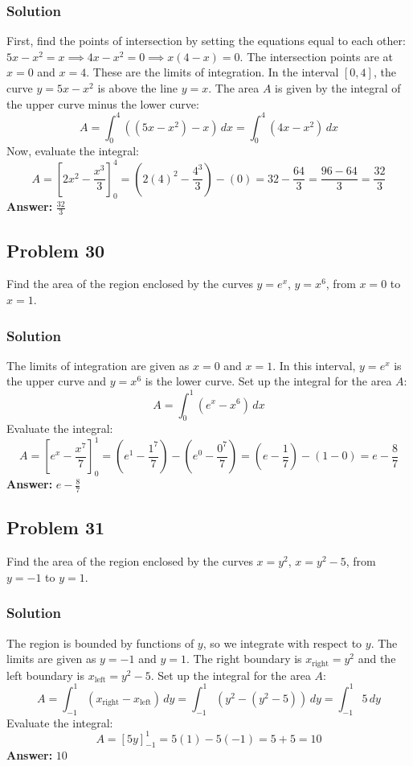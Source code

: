\documentclass{article}
\begin{document}
\subsubsection*{Solution}
First, find the points of intersection by setting the equations equal to each other: $5x - x^2 = x \implies 4x - x^2 = 0 \implies x(4 - x) = 0$. The intersection points are at $x = 0$ and $x = 4$. These are the limits of integration.
In the interval $[0, 4]$, the curve $y = 5x - x^2$ is above the line $y = x$.
The area $A$ is given by the integral of the upper curve minus the lower curve:
$$ A = \int_{0}^{4} ((5x - x^2) - x) \,dx = \int_{0}^{4} (4x - x^2) \,dx $$
Now, evaluate the integral:
$$ A = \left[ 2x^2 - \frac{x^3}{3} \right]_{0}^{4} = \left(2(4)^2 - \frac{4^3}{3}\right) - (0) = 32 - \frac{64}{3} = \frac{96 - 64}{3} = \frac{32}{3} $$
\textbf{Answer:} $ \frac{32}{3} $

\subsection{Problem 30}
Find the area of the region enclosed by the curves $y = e^x$, $y = x^6$, from $x = 0$ to $x = 1$.
\subsubsection*{Solution}
The limits of integration are given as $x=0$ and $x=1$. In this interval, $y=e^x$ is the upper curve and $y=x^6$ is the lower curve.
Set up the integral for the area $A$:
$$ A = \int_{0}^{1} (e^x - x^6) \,dx $$
Evaluate the integral:
$$ A = \left[ e^x - \frac{x^7}{7} \right]_{0}^{1} = \left(e^1 - \frac{1^7}{7}\right) - \left(e^0 - \frac{0^7}{7}\right) = \left(e - \frac{1}{7}\right) - (1 - 0) = e - \frac{8}{7} $$
\textbf{Answer:} $ e - \frac{8}{7} $

\subsection{Problem 31}
Find the area of the region enclosed by the curves $x = y^2$, $x = y^2 - 5$, from $y = -1$ to $y = 1$.
\subsubsection*{Solution}
The region is bounded by functions of $y$, so we integrate with respect to $y$. The limits are given as $y=-1$ and $y=1$.
The right boundary is $x_{\text{right}} = y^2$ and the left boundary is $x_{\text{left}} = y^2 - 5$.
Set up the integral for the area $A$:
$$ A = \int_{-1}^{1} (x_{\text{right}} - x_{\text{left}}) \,dy = \int_{-1}^{1} (y^2 - (y^2 - 5)) \,dy = \int_{-1}^{1} 5 \,dy $$
Evaluate the integral:
$$ A = \left[ 5y \right]_{-1}^{1} = 5(1) - 5(-1) = 5 + 5 = 10 $$
\textbf{Answer:} $ 10 $
\end{document}
